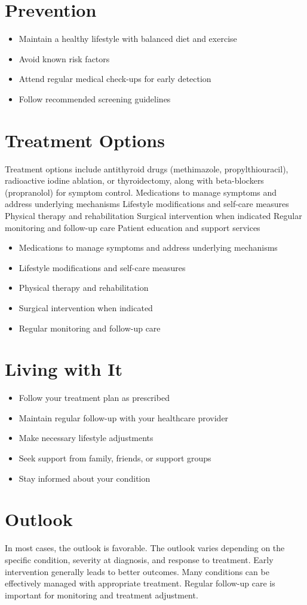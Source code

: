 \section{Prevention}
\begin{itemize}[noitemsep]
  \item Maintain a healthy lifestyle with balanced diet and exercise
  \item Avoid known risk factors
  \item Attend regular medical check-ups for early detection
  \item Follow recommended screening guidelines
\end{itemize}
\section{Treatment Options}
Treatment options include antithyroid drugs (methimazole, propylthiouracil), radioactive iodine ablation, or thyroidectomy, along with beta-blockers (propranolol) for symptom control. Medications to manage symptoms and address underlying mechanisms Lifestyle modifications and self-care measures Physical therapy and rehabilitation Surgical intervention when indicated Regular monitoring and follow-up care Patient education and support services

\begin{itemize}[noitemsep]
  \item Medications to manage symptoms and address underlying mechanisms
  \item Lifestyle modifications and self-care measures
  \item Physical therapy and rehabilitation
  \item Surgical intervention when indicated
  \item Regular monitoring and follow-up care
\end{itemize}
\section{Living with It}
\begin{itemize}[noitemsep]
  \item Follow your treatment plan as prescribed
  \item Maintain regular follow-up with your healthcare provider
  \item Make necessary lifestyle adjustments
  \item Seek support from family, friends, or support groups
  \item Stay informed about your condition
\end{itemize}
\section{Outlook}
In most cases, the outlook is favorable. The outlook varies depending on the specific condition, severity at diagnosis, and response to treatment. Early intervention generally leads to better outcomes. Many conditions can be effectively managed with appropriate treatment. Regular follow-up care is important for monitoring and treatment adjustment.
